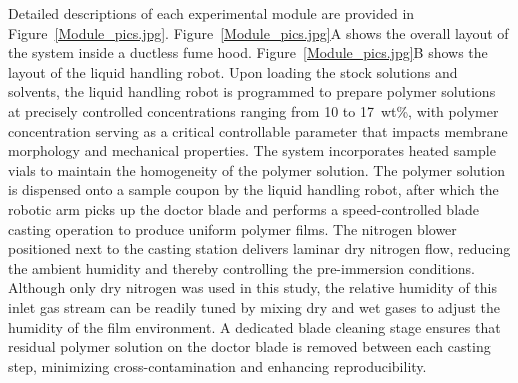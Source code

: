 \documentclass[preprint,12pt,times]{elsarticle}
\begin{document}
Detailed descriptions of each experimental module are provided in Figure~\ref{Module_pics.jpg}. Figure~\ref{Module_pics.jpg}A shows the overall layout of the system inside a ductless fume hood. Figure~\ref{Module_pics.jpg}B shows the layout of the liquid handling robot. Upon loading the stock solutions and solvents, the liquid handling robot is programmed to prepare polymer solutions at precisely controlled concentrations ranging from 10 to 17~wt\%, with polymer concentration serving as a critical controllable parameter that impacts membrane morphology and mechanical properties. The system incorporates heated sample vials to maintain the homogeneity of the polymer solution. The polymer solution is dispensed onto a sample coupon by the liquid handling robot, after which the robotic arm picks up the doctor blade and performs a speed-controlled blade casting operation to produce uniform polymer films. The nitrogen blower positioned next to the casting station delivers laminar dry nitrogen flow, reducing the ambient humidity and thereby controlling the pre-immersion conditions. Although only dry nitrogen was used in this study, the relative humidity of this inlet gas stream can be readily tuned by mixing dry and wet gases to adjust the humidity of the film environment. A dedicated blade cleaning stage ensures that residual polymer solution on the doctor blade is removed between each casting step, minimizing cross-contamination and enhancing reproducibility. 
\end{document}
